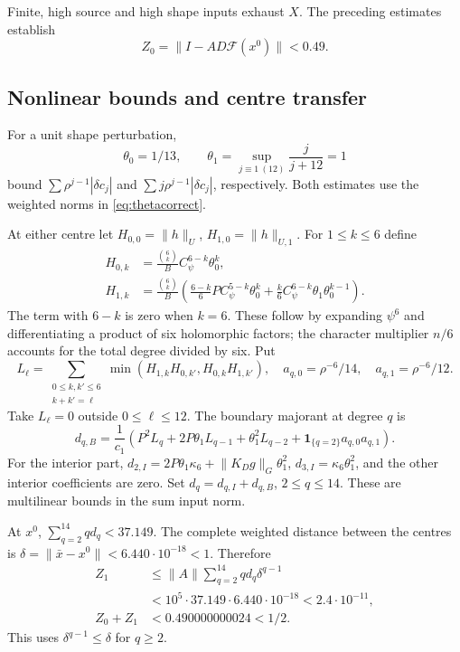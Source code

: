 \documentclass[11pt]{amsart}
\theoremstyle{remark}
\numberwithin{equation}{section}
\newcommand{\F}{\mathcal F}
\newcommand{\norm}[1]{\lVert#1\rVert}
\begin{document}
Finite, high source and high shape inputs exhaust $X$. The preceding
estimates establish
\begin{equation}\label{eq:r14Z0}
 Z_0=\norm{I-AD\F(x^0)}<0.49.
\end{equation}

\subsection{Nonlinear bounds and centre transfer}
For a unit shape perturbation,
\[
 \theta_0=1/13,\qquad
 \theta_1=\sup_{j\equiv1\ (12)}\frac{j}{j+12}=1
\]
bound $\sum\rho^{j-1}|\delta c_j|$ and
$\sum j\rho^{j-1}|\delta c_j|$, respectively. Both estimates use the weighted norms in \eqref{eq:thetacorrect}.

At either centre let $H_{0,0}=\norm h_U$, $H_{1,0}=\norm h_{U,1}$.
For $1\le k\le6$ define
\begin{align*}
 H_{0,k}&=\frac{\binom6k}{B}C_\psi^{6-k}\theta_0^k,\\
 H_{1,k}&=\frac{\binom6k}{B}
 \left(\frac{6-k}{6}P C_\psi^{5-k}\theta_0^k
       +\frac{k}{6}C_\psi^{6-k}\theta_1\theta_0^{k-1}\right).
\end{align*}
The term with $6-k$ is zero when $k=6$.
These follow by expanding $\psi^6$ and differentiating a product of six
holomorphic factors; the character multiplier $n/6$ accounts for the
total degree divided by six. Put
\[
 L_\ell=\sum_{\substack{0\le k,k'\le6\\k+k'=\ell}}
       \min(H_{1,k}H_{0,k'},H_{0,k}H_{1,k'}),
 \quad a_{q,0}=\rho^{-6}/14,\quad a_{q,1}=\rho^{-6}/12.
\]
Take $L_\ell=0$ outside $0\le\ell\le12$. The boundary majorant at degree
$q$ is
\[
 d_{q,B}=\frac1{c_1}
   \left(P^2L_q+2P\theta_1L_{q-1}+\theta_1^2L_{q-2}
             +\mathbf1_{\{q=2\}}a_{q,0}a_{q,1}\right).
\]
For the interior part,
$d_{2,I}=2P\theta_1\kappa_6+\norm{K_Dg}_G\theta_1^2$,
$d_{3,I}=\kappa_6\theta_1^2$, and the other interior coefficients are
zero. Set $d_q=d_{q,I}+d_{q,B}$, $2\le q\le14$.
These are multilinear bounds in the sum input norm.

At $x^0$, $\sum_{q=2}^{14}qd_q<37.149$. The complete weighted
distance between the centres is
$\delta=\norm{\bar x-x^0}<6.440\cdot10^{-18}<1$.
Therefore
\begin{equation}\label{eq:r14transfer}
\begin{aligned}
 Z_1&\le\norm A\sum_{q=2}^{14}qd_q\delta^{q-1}\\
    &<10^5\cdot37.149\cdot6.440\cdot10^{-18}<2.4\cdot10^{-11},\\
 Z_0+Z_1&<0.490000000024<1/2.
\end{aligned}
\end{equation}
This uses $\delta^{q-1}\le\delta$ for $q\ge2$.
\end{document}
